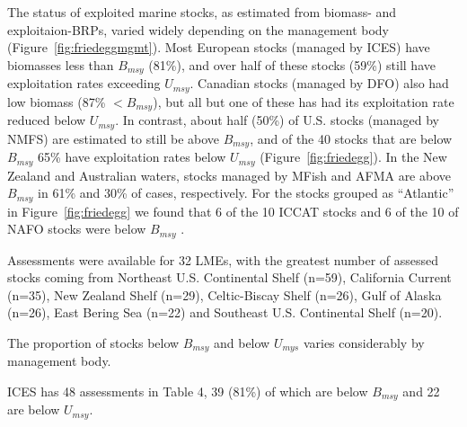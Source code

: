 The status of exploited marine stocks, as estimated from biomass- and
exploitaion-BRPs, varied widely depending on the management body
(Figure~\ref{fig:friedeggmgmt}). Most European stocks (managed by
ICES) have biomasses less than $B_{msy}$
(81\%), and over half of these
stocks (59\%) still
have exploitation rates exceeding $U_{msy}$. Canadian stocks (managed
by DFO) also had low biomass (87\%
$< B_{msy}$), but all but one of these has had its exploitation rate
reduced below $U_{msy}$. In contrast, about half
(50\%) of U.S. stocks (managed by
NMFS) are estimated to still be above $B_{msy}$, and of the
40 stocks that are below $B_{msy}$
65\% have exploitation
rates below $U_{msy}$ (Figure~\ref{fig:friedegg}). In the New
Zealand and Australian waters, stocks managed by MFish and AFMA are
above $B_{msy}$ in 61\% and
30\% of cases, respectively. For
the stocks grouped as ``Atlantic'' in Figure~\ref{fig:friedegg} we
found that 6 of the
10 ICCAT stocks and
6 of the
10 of NAFO stocks were below $B_{msy}$ .



Assessments were available for 32 LMEs, with the greatest number of
assessed stocks coming from Northeast U.S. Continental Shelf (n=59),
California Current (n=35), New Zealand Shelf (n=29),
Celtic-Biscay Shelf (n=26), Gulf of Alaska (n=26), East Bering Sea (n=22)
and Southeast U.S. Continental Shelf (n=20).

The proportion of stocks below $B_{msy}$ and below $U_{mys}$ varies considerably by management body. 

ICES has 48 assessments in Table 4,
39
(81\%) of which are below
$B_{msy}$ and 22 are below
$U_{msy}$.
